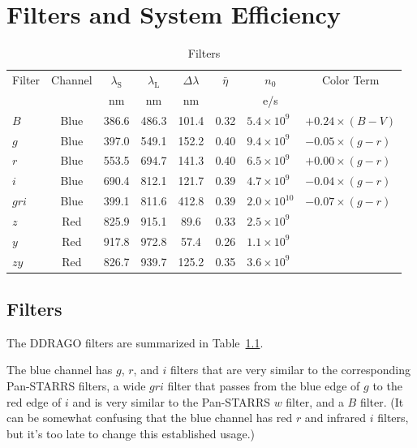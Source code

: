 \chapter{Filters and System Efficiency}

\begin{table}
\centering
\caption{Filters}
\medskip
\label{table:filters}
\footnotesize
\begin{tabular}{lccccccl}
\toprule
Filter&Channel&$\lambda_\mathrm{S}$&$\lambda_\mathrm{L}$&$\Delta\lambda$&$\bar\eta$&$n_0$&\multicolumn{1}{c}{Color Term}\\
&&nm&nm&nm&&\unit{e/s}\\
\midrule
$B$   & Blue & 386.6 & 486.3 & \phantom{}101.4 & 0.32 & $5.4 \times 10^{9\phantom{0}}$ & $+0.24 \times (B-V)$\\
$g$   & Blue & 397.0 & 549.1 & \phantom{}152.2 & 0.40 & $9.4 \times 10^{9\phantom{0}}$ & $-0.05 \times (g-r)$\\
$r$   & Blue & 553.5 & 694.7 & \phantom{}141.3 & 0.40 & $6.5 \times 10^{9\phantom{0}}$& $+0.00 \times (g-r)$\\
$i$   & Blue & 690.4 & 812.1 & \phantom{}121.7 & 0.39 & $4.7 \times 10^{9\phantom{0}}$& $-0.04 \times (g-r)$\\
$gri$ & Blue & 399.1 & 811.6 & \phantom{}412.8 & 0.39 & $2.0 \times 10^{10\phantom{}}$& $-0.07 \times (g-r)$\\
$z$   & Red  & 825.9 & 915.1 & \phantom{0}89.6 & 0.33 & $2.5 \times 10^{9\phantom{0}}$& \\
$y$   & Red  & 917.8 & 972.8 & \phantom{0}57.4 & 0.26 & $1.1 \times 10^{9\phantom{0}}$\\
$zy$  & Red  & 826.7 & 939.7 & \phantom{}125.2 & 0.35 & $3.6 \times 10^{9\phantom{0}}$\\
\bottomrule
\end{tabular}
\end{table}


\section{Filters}

The DDRAGO filters are summarized in Table~\ref{table:filters}.

The blue channel has $g$, $r$, and $i$ filters that are very similar to the corresponding Pan-STARRS filters, a wide $gri$ filter that passes from the blue edge of $g$ to the red edge of $i$ and is very similar to the Pan-STARRS $w$ filter, and a $B$ filter. (It can be somewhat confusing that the blue channel has red $r$ and infrared $i$ filters, but it's too late to change this established usage.)

